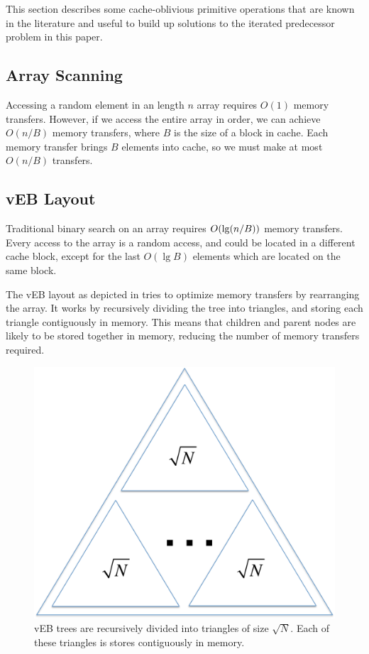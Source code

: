 
This section describes some cache-oblivious primitive operations that are known
in the literature and useful to build up solutions to the iterated predecessor problem
in this paper.

\subsection*{Array Scanning}
Accessing a random element in an length $n$ array requires $O(1)$ memory
transfers. However, if we access the entire array in order, we can achieve
$O(n/B)$ memory transfers, where $B$ is the size of a block in cache. Each
memory transfer brings $B$ elements into cache, so we must make at most
$O(n/B)$ transfers.

\subsection*{vEB Layout} 
Traditional binary search on an array requires $O(\lg \mathopen{}\left(n/B\right)\mathclose{})$ 
memory transfers. Every access to the array is a random access, and could
be located in a different cache block, except for the last $O(\lg B)$ elements
which are located on the same block.

The vEB layout as depicted in  tries to optimize 
memory transfers by rearranging the array. It
works by recursively dividing the tree into triangles, and storing each
triangle contiguously in memory. This means that children and parent nodes are
likely to be stored together in memory, reducing the number of memory transfers
required.

\begin{figure}[h]
\begin{center}
\includegraphics[scale=.35]{veb.pdf}
\end{center}
\caption{vEB trees are recursively divided into triangles of size $\sqrt{N}$. Each of these
triangles is stores contiguously in memory.}
\label{fig:veb} 
\end{figure}

